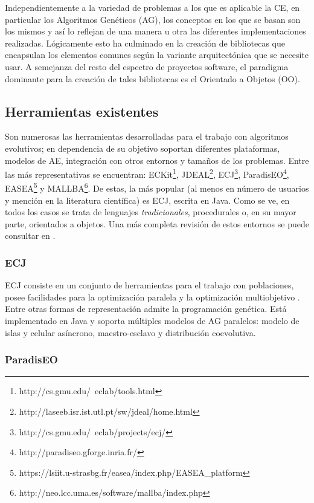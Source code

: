 \label{sec:fprog2ae}

Independientemente a la variedad de problemas a los que es aplicable la CE, en particular los Algoritmos Genéticos (AG), los conceptos en los que se basan son los mismos y así lo reflejan de una manera u otra las diferentes implementaciones realizadas. Lógicamente esto ha culminado en la creación de bibliotecas que encapsulan los elementos comunes según la variante arquitectónica que se necesite usar. A semejanza del resto del espectro de proyectos software, el paradigma dominante para la creación de tales bibliotecas es el Orientado a Objetos (OO).

\subsection{Herramientas existentes}

Son numerosas las herramientas desarrolladas para el trabajo con
algoritmos evolutivos; en dependencia de su objetivo soportan
diferentes plataformas, modelos de AE, integración con otros entornos
y tamaños de los problemas. Entre las más representativas se
encuentran: ECKit\footnote{http://cs.gmu.edu/~eclab/tools.html},
JDEAL\footnote{http://laseeb.isr.ist.utl.pt/sw/jdeal/home.html},
ECJ\footnote{http://cs.gmu.edu/~eclab/projects/ecj/},
ParadisEO\footnote{http://paradiseo.gforge.inria.fr/},
EASEA\footnote{https://lsiit.u-strasbg.fr/easea/index.php/EASEA\_platform}
y MALLBA\footnote{http://neo.lcc.uma.es/software/mallba/index.php}. De
estas, la más popular (al menos en número de usuarios y mención en la
literatura científica) es ECJ, escrita en Java. Como se ve, en todos
los casos se trata de lenguajes {\em tradicionales}, procedurales o,
en su mayor parte, orientados a objetos. Una más completa revisión de estos entornos se puede consultar en \cite{J.A.Parejo2011}.


\subsubsection{ECJ}

ECJ consiste en un conjunto de herramientas para el trabajo con poblaciones, posee facilidades para la optimización paralela y la optimización multiobjetivo \cite{Luke2010}. Entre otras formas de representación admite la programación genética. Está implementado en Java y soporta múltiples modelos de AG paralelos: modelo de islas y celular asíncrono, maestro-esclavo y distribución coevolutiva.

\subsubsection{ParadisEO}


